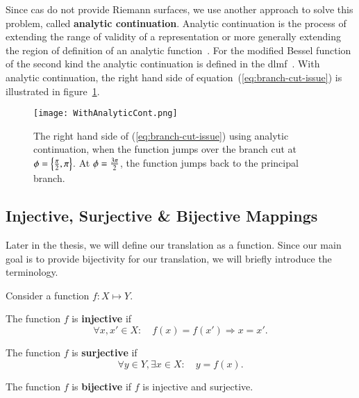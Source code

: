 Since \gls{cas} do not provide Riemann surfaces, we use another approach to solve this problem, called \textbf{analytic continuation}. Analytic continuation is the process of extending the range of validity of a representation or more generally extending the region of definition of an analytic function~\cite[152]{ComplexVariables}. For the modified Bessel function of the second kind the analytic continuation is defined in the \gls{dlmf}~\cite[(10.34.4)]{NIST:DLMF}. With analytic continuation, the right hand side of equation~(\ref{eq:branch-cut-issue}) is illustrated in figure~\ref{fig:analytic-cont}.

\begin{figure}[!ht]
    \centering
    \texttt{[image: WithAnalyticCont.png]}
    \caption{The right hand side of (\ref{eq:branch-cut-issue}) using analytic continuation, when the function jumps over the branch cut at $\phi = \left\{\frac{{\pi}}{2},{\pi}\right\}$. At $\phi = \frac{3{\pi}}{2}$, the function jumps back to the principal branch.}
    \label{fig:analytic-cont}
\end{figure}

\subsection{Injective, Surjective \& Bijective Mappings}
Later in the thesis, we will define our translation as a function. Since our main goal is to provide bijectivity for our translation, we will briefly introduce the terminology.

Consider a function $f: X \mapsto Y$.

\begin{definition}
The function $f$ is \textbf{injective} if
\begin{equation}
\forall x,x' \in X: \quad f(x) = f(x') \Rightarrow x = x'.
\end{equation}
\end{definition}

\begin{definition}
The function $f$ is \textbf{surjective} if
\begin{equation}
\forall y \in Y, \exists x \in X: \quad y = f(x).
\end{equation}
\end{definition}

\begin{definition}[Bijection]
The function $f$ is \textbf{bijective} if $f$ is injective and surjective.
\end{definition}

